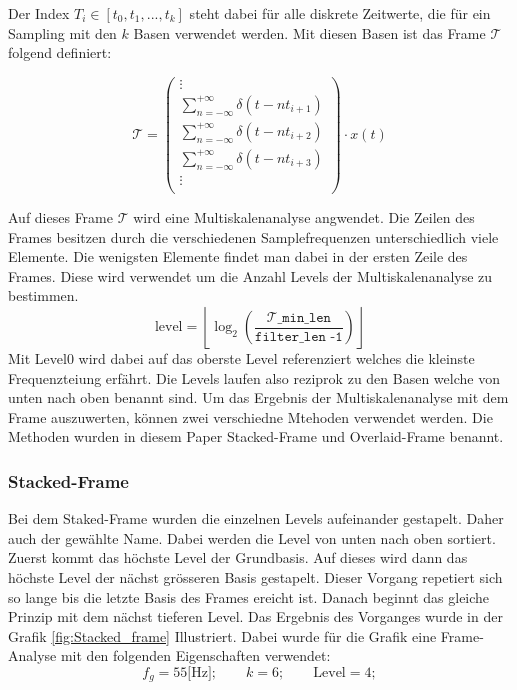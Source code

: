 Der Index $T_{i}\in[t_{0},t_{1},...,t_{k}]$ steht dabei für alle diskrete Zeitwerte, die für ein Sampling mit den $k$ Basen verwendet werden. Mit diesen Basen ist das Frame $\mathcal{T}$ folgend definiert:

\[
\mathcal{T}
=
\begin{pmatrix}
\vdots\\
\displaystyle\sum_{n=-\infty}^{+\infty} \delta(t - nt_{i+1})\\[1mm]
\displaystyle\sum_{n=-\infty}^{+\infty} \delta(t - nt_{i+2})\\[1mm]
\displaystyle\sum_{n=-\infty}^{+\infty} \delta(t - nt_{i+3})\\[1mm]
\vdots\\
\end{pmatrix}
\cdot x(t)
\]


Auf dieses Frame $\mathcal{T}$ wird eine Multiskalenanalyse angwendet. Die Zeilen des Frames besitzen durch die verschiedenen Samplefrequenzen unterschiedlich viele Elemente. Die wenigsten Elemente findet man dabei in der ersten Zeile des Frames. Diese wird verwendet um die Anzahl Levels der Multiskalenanalyse zu bestimmen. 
\[\text{level} = \left\lfloor\log_2\left(\mathtt{
	\frac{\mathcal{T}\_\text{min\_len}}{\text{filter\_len -1}}}\right)\right\rfloor
\]
Mit Level0 wird dabei auf das oberste Level referenziert welches die kleinste Frequenzteiung erfährt. Die Levels laufen also reziprok zu den Basen welche von unten nach oben benannt sind. Um das Ergebnis der Multiskalenanalyse mit dem Frame auszuwerten, können zwei verschiedne Mtehoden verwendet werden. Die Methoden wurden in diesem Paper Stacked-Frame und Overlaid-Frame benannt. 

\newpage


\subsubsection{Stacked-Frame} 

Bei dem Staked-Frame wurden die einzelnen Levels aufeinander gestapelt. Daher auch der gewählte Name. Dabei werden die Level von unten nach oben sortiert. Zuerst kommt das höchste Level der Grundbasis. Auf dieses wird dann das höchste Level der nächst grösseren Basis gestapelt. Dieser Vorgang repetiert sich so lange bis die letzte Basis des Frames ereicht ist. Danach beginnt das gleiche Prinzip mit dem nächst tieferen Level. Das Ergebnis des Vorganges wurde in der Grafik \ref{fig:Stacked_frame} Illustriert. Dabei wurde für die Grafik eine Frame-Analyse mit den folgenden Eigenschaften verwendet:
\[
f_{g}=55\text{[Hz]}; \qquad
k = 6 ; \qquad
\text{Level}= 4;
\] 




